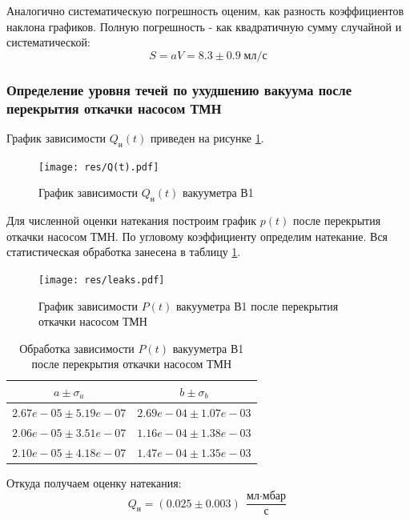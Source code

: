 \documentclass[12pt,a4paper]{article}
\begin{document}
	Аналогично систематическую погрешность оценим, как разность коэффициентов наклона графиков. Полную погрешность - как квадратичную сумму случайной и систематической:
	$$S = aV = 8.3 \pm 0.9 \; \text{мл}/\text{с}$$
	
	\subsubsection*{Определение уровня течей по ухудшению вакуума после перекрытия откачки насосом ТМН}
	График зависимости $Q_{\text{н}}(t)$ приведен на рисунке \ref{fig:Q(t)}. 
	\begin{figure}[H]
		\caption{График зависимости $Q_{\text{н}}(t)$ вакууметра В1}
		\label{fig:Q(t)}
		\centering
		\texttt{[image: res/Q(t).pdf]}
	\end{figure}
	
	Для численной оценки натекания построим график $p(t)$ после перекрытия откачки насосом ТМН.
	По угловому коэффициенту определим натекание. Вся статистическая обработка занесена в таблицу \ref{tab:natek}.
	
	\begin{figure}[H]
		\caption{График зависимости $P(t)$ вакууметра В1 после перекрытия откачки насосом ТМН}
		\label{fig:natek}
		\centering
		\texttt{[image: res/leaks.pdf]}
	\end{figure}
	
	\begin{table}[H]	
		\caption{Обработка зависимости $P(t)$ вакууметра В1 после перекрытия откачки насосом ТМН}
		\label{tab:natek}
		\centering
		\footnotesize
		\begin{tabular}{cc}
			\toprule
			$a \pm \sigma_a$ & $b \pm \sigma_b$ \\
			\midrule
			$2.67e-05 \pm 5.19e-07$     &    $2.69e-04 \pm 1.07e-03$ \\
			$2.06e-05 \pm 3.51e-07$     &    $1.16e-04 \pm 1.38e-03$ \\
			$2.10e-05 \pm 4.18e-07$     &    $1.47e-04 \pm 1.35e-03$ \\
			\bottomrule
		\end{tabular}
	\end{table}
	
	Откуда получаем оценку натекания: 
	$$Q_{\text{н}} = (0.025 \pm 0.003) \; \frac{\text{мл}\cdot\text{мбар}}{\text{с}}$$
	
\end{document}
